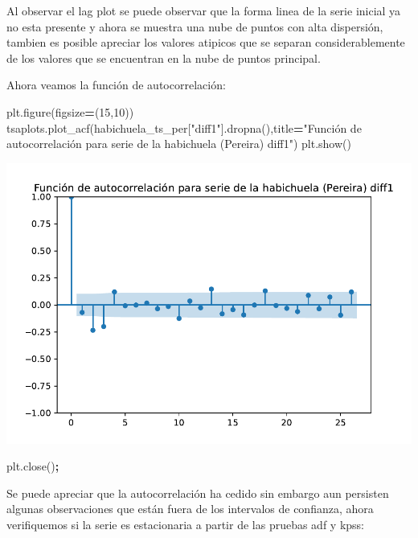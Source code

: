 \documentclass[
]{book}
\newenvironment{Shaded}{\begin{snugshade}}{\end{snugshade}}
\newcommand{\DecValTok}[1]{\textcolor[rgb]{0.00,0.00,0.81}{#1}}
\newcommand{\NormalTok}[1]{#1}
\newcommand{\OperatorTok}[1]{\textcolor[rgb]{0.81,0.36,0.00}{\textbf{#1}}}
\newcommand{\StringTok}[1]{\textcolor[rgb]{0.31,0.60,0.02}{#1}}
\begin{document}
Al observar el lag plot se puede observar que la forma linea de la serie inicial ya no esta presente y ahora se muestra una nube de puntos con alta dispersión, tambien es posible apreciar los valores atipicos que se separan considerablemente de los valores que se encuentran en la nube de puntos principal.

Ahora veamos la función de autocorrelación:

\begin{Shaded}
\begin{Highlighting}[]

\NormalTok{plt.figure(figsize}\OperatorTok{=}\NormalTok{(}\DecValTok{15}\NormalTok{,}\DecValTok{10}\NormalTok{))}
\NormalTok{tsaplots.plot\_acf(habichuela\_ts\_per[}\StringTok{"diff1"}\NormalTok{].dropna(),title}\OperatorTok{=}\StringTok{"Función de autocorrelación para serie de la habichuela (Pereira) diff1"}\NormalTok{)}
\NormalTok{plt.show()}
\end{Highlighting}
\end{Shaded}

\includegraphics{bookdown-demo_files/figure-latex/unnamed-chunk-112-97.pdf}

\begin{Shaded}
\begin{Highlighting}[]
\NormalTok{plt.close()}\OperatorTok{;}
\end{Highlighting}
\end{Shaded}

Se puede apreciar que la autocorrelación ha cedido sin embargo aun persisten algunas observaciones que están fuera de los intervalos de confianza, ahora verifiquemos si la serie es estacionaria a partir de las pruebas adf y kpss:
\end{document}
